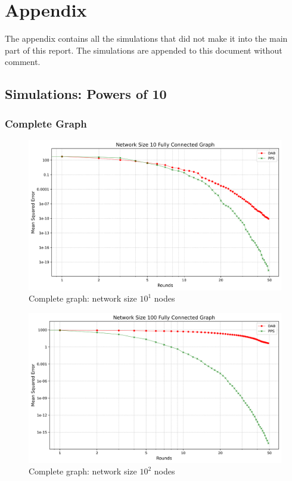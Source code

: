 \chapter{Appendix}\label{chap:appendix}
The appendix contains all the simulations that did not make it into the main part of this report. The simulations are appended to this document without comment.
\section{Simulations: Powers of 10}
\subsection{Complete Graph}
\begin{figure}[H]
    \centering
    \includegraphics[scale=0.5]{figures/completeGraphSimulations/DAB_vs_PPS_FCG_r50_n10.png}
    \caption{Complete graph: network size $10^{1}$ nodes}
    \label{fig:10CompleteGraph}
\end{figure}
\begin{figure}[H]
    \centering
    \includegraphics[scale=0.5]{figures/completeGraphSimulations/DAB_vs_PPS_FCG_r50_n100.png}
    \caption{Complete graph: network size $10^{2}$ nodes}
    \label{fig:100CompleteGraph}
\end{figure}
